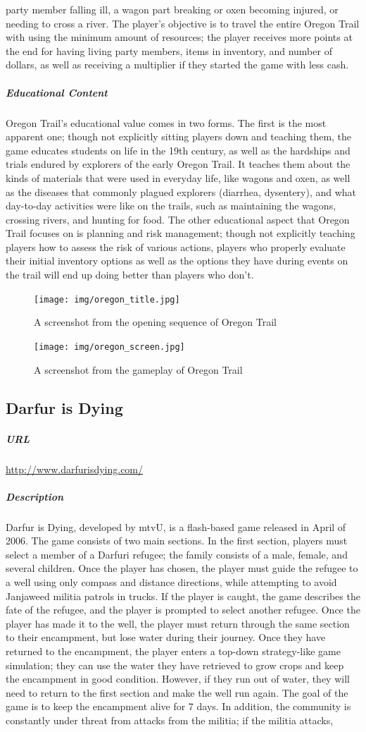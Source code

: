party member falling ill, a wagon part breaking or oxen becoming injured, or needing to cross a river. The player's objective is to travel the entire Oregon Trail with using the minimum amount of resources; the player receives more points at the end for having living party members, items in inventory, and number of dollars, as well as receiving a multiplier if they started the game with less cash.\subparagraph{Educational Content}Oregon Trail's educational value comes in two forms. The first is the most apparent one; though not explicitly sitting players down and teaching them, the game educates students on life in the 19th century, as well as the hardships and trials endured by explorers of the early Oregon Trail. It teaches them about the kinds of materials that were used in everyday life, like wagons and oxen, as well as the diseases that commonly plagued explorers (diarrhea, dysentery), and what day-to-day activities were like on the trails, such as maintaining the wagons, crossing rivers, and hunting for food. The other educational aspect that Oregon Trail focuses on is planning and risk management; though not explicitly teaching players how to assess the risk of various actions, players who properly evaluate their initial inventory options as well as the options they have during events on the trail will end up doing better than players who don't.\begin{figure}[h!]\centering \texttt{[image: img/oregon\_title.jpg]}\caption{A screenshot from the opening sequence of Oregon Trail}\end{figure}\begin{figure}[h!]\centering \texttt{[image: img/oregon\_screen.jpg]}\caption{A screenshot from the gameplay of Oregon Trail}\end{figure}\newpage\subsection{Darfur is Dying}\subparagraph{URL}\url{http://www.darfurisdying.com/}\subparagraph{Description}Darfur is Dying, developed by mtvU, is a flash-based game released in April of 2006. The game consists of two main sections. In the first section, players must select a member of a Darfuri refugee; the family consists of a male, female, and several children. Once the player has chosen, the player must guide the refugee to a well using only compass and distance directions, while attempting to avoid Janjaweed militia patrols in trucks. If the player is caught, the game describes the fate of the refugee, and the player is prompted to select another refugee. Once the player has made it to the well, the player must return through the same section to their encampment, but lose water during their journey. Once they have returned to the encampment, the player enters a top-down strategy-like game simulation; they can use the water they have retrieved to grow crops and keep the encampment in good condition. However, if they run out of water, they will need to return to the first section and make the well run again. The goal of the game is to keep the encampment alive for 7 days. In addition, the community is constantly under threat from attacks from the militia; if the militia attacks, 